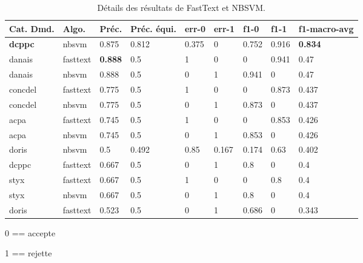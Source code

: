  \begin{table}
 	\scriptsize
 	\begin{tabular}{|l|l|l|l|l|l|l|l|l|}
 		\hline
 		\textbf{Cat. Dmd.} & \textbf{Algo.} & \textbf{Préc.}   & \textbf{Préc. équi.} & \textbf{err-0} & \textbf{err-1} & \textbf{f1-0}  & \textbf{f1-1}  & \textbf{f1-macro-avg} \\ \hline
 		\textbf{dcppc}       & nbsvm      & 0.875 & 0.812        & 0.375 & 0     & 0.752 & 0.916 & \textbf{0.834}        \\ \hline
 		danais      & fasttext   & \textbf{0.888} & 0.5          & 1     & 0     & 0     & 0.941 & 0.47         \\ \hline
 		danais      & nbsvm      & 0.888 & 0.5          & 0     & 1     & 0.941 & 0     & 0.47         \\ \hline
 		concdel     & fasttext   & 0.775 & 0.5          & 1     & 0     & 0     & 0.873 & 0.437        \\ \hline
 		concdel     & nbsvm      & 0.775 & 0.5          & 0     & 1     & 0.873 & 0     & 0.437        \\ \hline
 		acpa        & fasttext   & 0.745 & 0.5          & 1     & 0     & 0     & 0.853 & 0.426        \\ \hline
 		acpa        & nbsvm      & 0.745 & 0.5          & 0     & 1     & 0.853 & 0     & 0.426        \\ \hline
 		doris       & nbsvm      & 0.5   & 0.492        & 0.85  & 0.167 & 0.174 & 0.63  & 0.402        \\ \hline
 		dcppc       & fasttext   & 0.667 & 0.5          & 0     & 1     & 0.8   & 0     & 0.4          \\ \hline
 		styx        & fasttext   & 0.667 & 0.5          & 1     & 0     & 0     & 0.8   & 0.4          \\ \hline
 		styx        & nbsvm      & 0.667 & 0.5          & 0     & 1     & 0.8   & 0     & 0.4          \\ \hline
 		doris       & fasttext   & 0.523 & 0.5          & 0     & 1     & 0.686 & 0     & 0.343        \\ \hline
 	\end{tabular}
 	
 0 == accepte

1 == rejette

\caption{Détails des résultats de FastText et NBSVM.}\label{tab:sensrst:fasttextnbsvm}
 \end{table}

